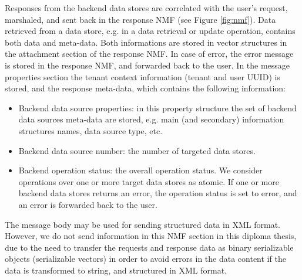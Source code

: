 Responses from the backend data stores are correlated with the user's request, marshaled, and sent back in the response \ac{NMF} (see Figure \ref{fig:nmf}). Data retrieved from a data store, e.g. in a data retrieval or update operation, contains both data and meta-data. Both informations are stored in vector structures in the attachment section of the response \ac{NMF}. In case of error, the error message is stored in the response \ac{NMF}, and forwarded back to the user. In the message properties section the tenant context information (tenant and user \ac{UUID}) is stored, and the response meta-data, which contains the following information:
	\begin{itemize}
		\item Backend data source properties: in this property structure the set of backend data sources meta-data are stored, e.g. main (and secondary) information structures names, data source type, etc.
		\item Backend data source number: the number of targeted data stores. 
		\item Backend operation status: the overall operation status. We consider operations over one or more target data stores as atomic. If one or more backend data stores returns an error, the operation status is set to error, and an error is forwarded back to the user. 
	\end{itemize}  

The message body may be used for sending structured data in \ac{XML} format. However, we do not send information in this \ac{NMF} section in this diploma thesis, due to the need to transfer the requests and response data as binary serializable objects (serializable vectors) in order to avoid errors in the data content if the data is transformed to string, and structured in XML format. 
\FloatBarrier